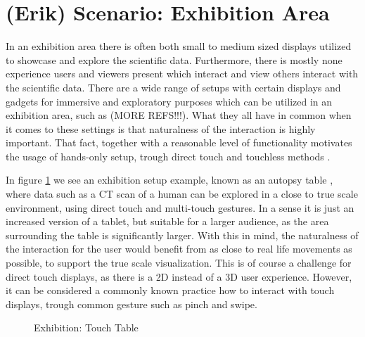 \documentclass[review,journal]{vgtc}         %
\begin{document}
\section{(Erik) Scenario: Exhibition Area}

In an exhibition area there is often both small to medium sized displays utilized to showcase and explore the scientific data. Furthermore, there is mostly none experience users and viewers present which interact and view others interact with the scientific data. There are a wide range of setups with certain displays and gadgets for immersive and exploratory purposes which can be utilized in an exhibition area, such as \cite{Laha:2013:VCB:2491367.2491368} (MORE REFS!!!). What they all have in common when it comes to these settings is that naturalness of the interaction is highly important. That fact, together with a reasonable level of functionality motivates the usage of hands-only setup, trough direct touch \cite{Klein:2012:DSD:2322389.2322403} and touchless methods \cite{O'hara:2013:NTP:2442106.2442111}.

In figure \ref{img:exhibition_table} we see an exhibition setup example, known as an autopsy table \cite{LRFPY11}, where data such as a CT scan of a human can be explored in a close to true scale environment, using direct touch and multi-touch gestures. In a sense it is just an increased version of a tablet, but suitable for a larger audience, as the area surrounding the table is significantly larger. With this in mind, the naturalness of the interaction for the user would benefit from as close to real life movements as possible, to support the true scale visualization. This is of course a challenge for direct touch displays, as there is a 2D instead of a 3D user experience. However, it can be considered a commonly known practice how to interact with touch displays, trough common gesture such as pinch and swipe.

\begin{figure}[htb]
	\centering
	\caption{Exhibition: Touch Table}
	\label{img:exhibition_table}
\end{figure}
\end{document}
